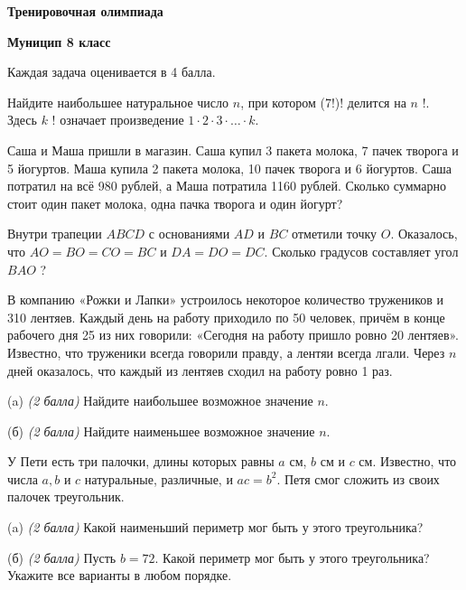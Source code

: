 \centerline{\bf \Huge Тренировочная олимпиада}
\centerline{\bf \Huge Муницип 8 класс}

\begin{flushright}
        \scriptsize{Каждая задача оценивается в 4 балла.}
\end{flushright}

 Найдите наибольшее натуральное число $n$, при котором (7!)! делится на $n$ !.
Здесь $k$ ! означает произведение $1 \cdot 2 \cdot 3 \cdot \ldots \cdot k$.

 Саша и Маша пришли в магазин. Саша купил 3 пакета молока, 7 пачек творога и 5 йогуртов. Маша купила 2 пакета молока, 10 пачек творога и 6 йогуртов. Саша потратил на всё 980 рублей, а Маша потратила 1160 рублей. Сколько суммарно стоит один пакет молока, одна пачка творога и один йогурт?

 Внутри трапеции $A B C D$ с основаниями $A D$ и $B C$ отметили точку $O$. Оказалось, что $A O=B O=C O=B C$ и $D A=D O=D C$. Сколько градусов составляет угол $B A O$ ?

 В компанию «Рожки и Лапки» устроилось некоторое количество тружеников и 310 лентяев. Каждый день на работу приходило по 50 человек, причём в конце рабочего дня 25 из них говорили: «Сегодня на работу пришло ровно 20 лентяев». Известно, что труженики всегда говорили правду, а лентяи всегда лгали. Через $n$ дней оказалось, что каждый из лентяев сходил на работу ровно 1 раз.

(a) \textit{(2 балла)} Найдите наибольшее возможное значение $n$.

(б) \textit{(2 балла)} Найдите наименьшее возможное значение $n$.

 У Пети есть три палочки, длины которых равны $a$ см, $b$ см и $c$ см. Известно, что числа $a, b$ и $c$ натуральные, различные, и $a c=b^2$. Петя смог сложить из своих палочек треугольник.

(a) \textit{(2 балла)} Какой наименьший периметр мог быть у этого треугольника?

(б) \textit{(2 балла)} Пусть $b=72$. Какой периметр мог быть у этого треугольника? Укажите все варианты в любом порядке.